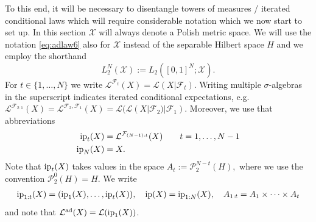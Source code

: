 \documentclass[a4paper]{amsart}
\numberwithin{theorem}{section}
\theoremstyle{definition}
\newcommand{\Xs}{\mathcal X}
\newcommand{\F}{\mathcal{F}}
\newcommand{\law}{\mathcal{L}}
\newcommand{\Pc}{\mathcal P}
\renewcommand{\H}{H}
\newcommand{\ip}{\textup{ip}}
\newcommand{\lawad}{\law^{\textup{ad}}}
\begin{document}
 To this end, it will be necessary to disentangle towers of measures / iterated conditional laws  which will require considerable notation which we now start to set up. In this section $\Xs$ will always denote a Polish metric space. We will use the notation \eqref{eq:adlaw6} also for  $\Xs$ instead of the separable Hilbert space $H$ and we employ the shorthand  
 $$L_2^N(\Xs):= L_2([0,1]^N; \Xs).$$
For $t \in \{1,\dots,N\}$ we write $ \law^{\F_t}(X) = \law(X|\F_t)$. Writing multiple $\sigma$-algebras in the superscript indicates iterated conditional expectations, e.g.\ $  \law^{\F_{2:1}}(X) =  \law^{\F_2,\F_1}(X) = \law(\law(X|\F_2)|\F_1)$. Moreover, we use that abbreviations
\begin{align}\label{eq:IpDef}
\begin{split}
    \ip_t(X) &= \law^{\F_{(N-1):t}}(X) \qquad t=1,\dots, N-1\\
    \ip_N(X) &= X.
\end{split}
    \end{align}
Note that $\ip_t(X)$ takes values in the space
 $
    A_t := \Pc_2^{N-t}(\H),
$ 
where we use the convention $\Pc_2^0(\H)=\H$. 
We  write 
\begin{align*}
    \ip_{1:t}(X) = (\ip_1(X),\dots, \ip_t(X)), \quad  \ip(X) = \ip_{1:N}(X),
    \quad  A_{1:t} = A_1  \times \dots \times A_t
\end{align*}
and note that $\lawad(X) = \law( \ip_1(X)  )$.
\end{document}
